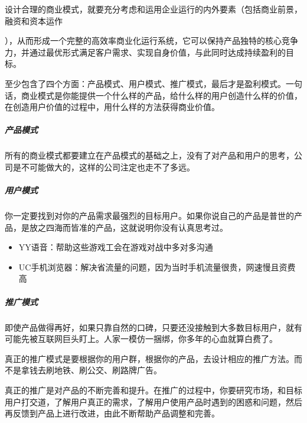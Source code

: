 \documentclass[letterpaper,11pt,english]{sphinxmanual}
\begin{document}
设计合理的商业模式，就要充分考虑和运用企业运行的内外要素（包括商业前景，融资和资本运作%
\begin{footnote}[336]\sphinxAtStartFootnote
{}
%
\end{footnote}），从而形成一个完整的高效率商业化运行系统，它可以保持产品独特的核心竞争力，并通过最优形式满足客户需求、实现自身价值，与此同时达成持续盈利的目标。
%
\begin{footnote}[337]\sphinxAtStartFootnote
{}
%
\end{footnote}

至少包含了四个方面：产品模式、用户模式、推广模式，最后才是盈利模式。一句话，商业模式是你能提供一个什么样的产品，给什么样的用户创造什么样的价值，在创造用户价值的过程中，用什么样的方法获得商业价值。


\subparagraph{产品模式}
\label{\detokenize{chapter_idea/business:id9}}
所有的商业模式都要建立在产品模式的基础之上，没有了对产品和用户的思考，公司是不可能做大的，这样的公司注定也走不了多远。


\subparagraph{用户模式}
\label{\detokenize{chapter_idea/business:id10}}
你一定要找到对你的产品需求最强烈的目标用户。如果你说自己的产品是普世的产品，是放之四海而皆准的产品，这就说明你没有认真思考过。
\begin{itemize}
\item {} 
YY语音：帮助这些游戏工会在游戏对战中多对多沟通

\item {} 
UC手机浏览器：解决省流量的问题，因为当时手机流量很贵，网速慢且资费高

\end{itemize}


\subparagraph{推广模式}
\label{\detokenize{chapter_idea/business:id11}}
即使产品做得再好，如果只靠自然的口碑，只要还没接触到大多数目标用户，就有可能先被互联网巨头盯上。人家一模仿一捆绑，你多年的心血就算白费了。

真正的推广模式是要根据你的用户群，根据你的产品，去设计相应的推广方法。而不是拿钱去刷地铁、刷公交、刷路牌广告。

真正的推广是对产品的不断完善和提升。在推广的过程中，你要研究市场，和目标用户打交道，了解用户真正的需求，了解用户使用产品时遇到的困惑和问题，然后再反馈到产品上进行改进，由此不断帮助产品调整和完善。
\end{document}
